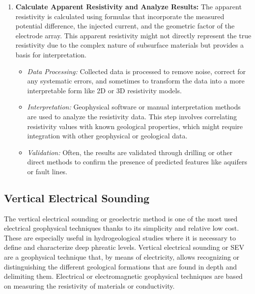 \documentclass[12pt,a4paper]{report}
\begin{document}
\begin{enumerate}
    \item \textbf{Calculate Apparent Resistivity and Analyze Results:} The apparent resistivity is calculated using formulas that incorporate the measured potential difference, the injected current, and the geometric factor of the electrode array. This apparent resistivity might not directly represent the true resistivity due to the complex nature of subsurface materials but provides a basis for interpretation. 
    \begin{itemize}
        \item \textit{Data Processing:} Collected data is processed to remove noise, correct for any systematic errors, and sometimes to transform the data into a more interpretable form like 2D or 3D resistivity models.
        \item \textit{Interpretation:} Geophysical software or manual interpretation methods are used to analyze the resistivity data. This step involves correlating resistivity values with known geological properties, which might require integration with other geophysical or geological data.
        \item \textit{Validation:} Often, the results are validated through drilling or other direct methods to confirm the presence of predicted features like aquifers or fault lines.
    \end{itemize}
\end{enumerate}

\subsection{Vertical Electrical Sounding}
The vertical electrical sounding or geoelectric method is one of the most used electrical geophysical techniques thanks to its simplicity and relative low cost. These are especially useful in hydrogeological studies where it is necessary to define and characterize deep phreatic levels. Vertical electrical sounding or SEV are a geophysical technique that, by means of electricity, allows recognizing or distinguishing the different geological formations that are found in depth and delimiting them. Electrical or electromagnetic geophysical techniques are based on measuring the resistivity of materials or conductivity.
\end{document}

